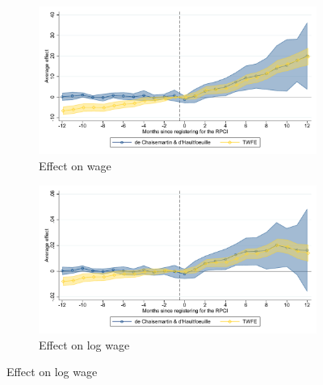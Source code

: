 \begin{figure}[H]
    \begin{subfigure}{0.49\textwidth}
    \caption{Effect on wage}
    \includegraphics[width=\textwidth]{04_Figures/muestra_10porciento/event_study_sal_cierre_connected.pdf}
    \end{subfigure}
    \begin{subfigure}{0.49\textwidth}
    \caption{Effect on log wage}
    \includegraphics[width=\textwidth]{04_Figures/muestra_10porciento/event_study_log_sal_cierre_connected.pdf}
    \end{subfigure}
    
\end{figure}



%
%
%

%




% 